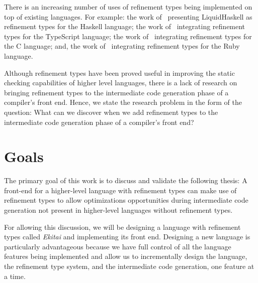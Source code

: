 \documentclass[
  oneside,
  english,
  coorientadorbanca,
  noabntexcite
]{ufsc-thesis-rn46-2019}
\begin{document}
There is an increasing number of uses of refinement types being implemented on top of existing languages.
For example: the work of~\textcite{vazou2014liquidhaskell} presenting LiquidHaskell as refinement types for the Haskell language; the work of~\textcite{vekris2016refinementtypescript} integrating refinement types for the TypeScript language; the work of~\textcite{sammler2021refinedc} integrating refinement types for the C language; and, the work of~\textcite{vazou2018refinementruby} integrating refinement types for the Ruby language.

Although refinement types have been proved useful in improving the static checking capabilities of higher level languages, there is a lack of research on bringing refinement types to the intermediate code generation phase of a compiler's front end.
Hence, we state the research problem in the form of the question: What can we discover when we add refinement types to the intermediate code generation phase of a compiler's front end?

\section{Goals}\label{chapter:introduction:sec:goals}

The primary goal of this work is to discuss and validate the following thesis: A front-end for a higher-level language with refinement types can make use of refinement types to allow optimizations opportunities during intermediate code generation not present in higher-level languages without refinement types.

For allowing this discussion, we will be designing a language with refinement types called \textit{Ekitai} and implementing its front end.
Designing a new language is particularly advantageous because we have full control of all the language features being implemented and allow us to incrementally design the language, the refinement type system, and the intermediate code generation, one feature at a time.
\end{document}
